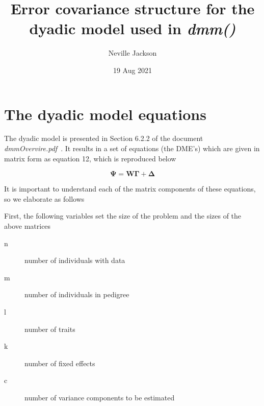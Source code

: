 \documentclass[titlepage]{article}  %
\title{ Error covariance structure for the dyadic model used in {\em dmm()}}
\author{Neville Jackson }
\date{19 Aug 2021}
\begin{document}
 
 
\maketitle      
\tableofcontents

\section{The dyadic model equations}
The dyadic model is presented in Section 6.2.2  of the document {\em dmmOvervire.pdf}~\cite{jack:15}. It results in a set of equations (the DME's) which are given in matrix form as equation 12, which is reproduced below

\begin{equation}
\mbox{$\bm{\Psi} = \bm{W}\bm{\Gamma} + \bm{\Delta}$}   \label{eqn:dme}
\end{equation}

It is important to understand each of the matrix components of these equations, so we elaborate as follows

First, the following variables set the size of the problem and the sizes of the above matrices
\begin{description}
\item[n] number of individuals with data
\item[m] number of individuals in pedigree
\item[l] number of traits
\item[k] number of fixed effects
\item[c] number of variance components to be estimated
\end{description}
\end{document}

